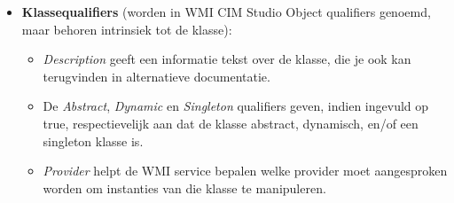 \documentclass[11pt,a4paper]{report}
\begin{document}
\begin{itemize}
	\item \textbf{Klassequalifiers} (worden in WMI CIM Studio Object qualifiers genoemd, maar behoren intrinsiek tot de klasse):
	\begin{itemize}
		\item \textit{Description} geeft een informatie tekst over de klasse, die je ook kan terugvinden in alternatieve documentatie.
		\item De \textit{Abstract}, \textit{Dynamic} en \textit{Singleton} qualifiers geven, indien ingevuld op true, respectievelijk aan dat de klasse abstract, dynamisch, en/of een singleton klasse is.
		\item \textit{Provider} helpt de WMI service bepalen welke provider moet aangesproken worden om instanties van die klasse te manipuleren.
	\end{itemize}
	

\end{itemize}
\end{document}
